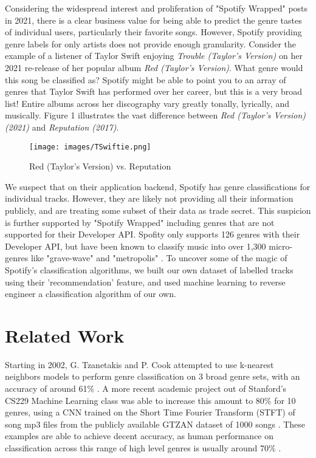 \documentclass[conference]{IEEEtran}
\begin{document}
Considering the widespread interest and proliferation of "Spotify Wrapped" posts in 2021, there is a clear business value for being able to predict the genre tastes of individual users, particularly their favorite songs. However, Spotify providing genre labels for only artists does not provide enough granularity. Consider the example of a listener of Taylor Swift enjoying \emph{Trouble (Taylor's Version)} on her 2021 re-release of her popular album \emph{Red (Taylor's Version)}. What genre would this song be classified as? Spotify might be able to point you to an array of genres that Taylor Swift has performed over her career, but this is a very broad list! Entire albums across her discography vary greatly tonally, lyrically, and musically. Figure 1 illustrates the vast difference between \emph{Red (Taylor's Version) (2021)} and \emph{Reputation (2017)}.

\begin{figure}[htbp]
\centerline{\texttt{[image: images/TSwiftie.png]}}
\caption{Red (Taylor's Version) vs. Reputation}
\label{fig}
\end{figure}

We suspect that on their application backend, Spotify has genre classifications for individual tracks. However, they are likely not providing all their information publicly, and are treating some subset of their data as trade secret. This suspicion is further supported by "Spotify Wrapped" including genres that are not supported for their Developer API. Spofity only supports 126 genres with their Developer API, but have been known to classify music into over 1,300 micro-genres like "grave-wave" and "metropolis" \cite{b1}. To uncover some of the magic of Spotify's classification algorithms, we built our own dataset of labelled tracks using their 'recommendation' feature, and used machine learning to reverse engineer a classification algorithm of our own. 

\section{Related Work}

Starting in 2002,  G. Tzanetakis and P. Cook attempted to use k-nearest neighbors models to perform genre classification on 3 broad genre sets, with an accuracy of around 61\% \cite{b2}. A more recent academic project out of Stanford's CS229 Machine Learning class was able to increase this amount to 80\% for 10 genres, using a CNN trained on the Short Time Fourier Transform (STFT) of song mp3 files from the publicly available GTZAN dataset of 1000 songs \cite{b3}. These examples are able to achieve decent accuracy, as human performance on classification across this range of high level genres is usually around 70\% \cite{b4}.
\end{document}
